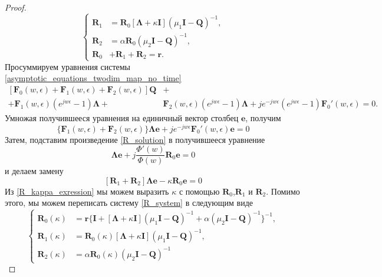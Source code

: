 \begin{proof}
\begin{equation} \label{R_system}
	\left\{
	\begin{aligned}
		\boldsymbol{R}_{1}& = \boldsymbol{R}_{0}[\boldsymbol{\Lambda} + \kappa\boldsymbol{I}](\mu_{1}\boldsymbol{I} - \boldsymbol{Q})^{-1},\\
		\boldsymbol{R}_{2}& = \alpha\boldsymbol{R}_{0}(\mu_2\boldsymbol{I} - \boldsymbol{Q})^{-1},\\
		\boldsymbol{R}_{0}& + \boldsymbol{R}_{1} + \boldsymbol{R}_{2} = \boldsymbol{r}.
	\end{aligned}
	\right.
\end{equation}
Просуммируем уравнения системы \eqref{asymptotic_equations_twodim_map_no_time}
\begin{equation*}
	\begin{split}
		[\boldsymbol{F}_{0}(w,\epsilon) + \boldsymbol{F}_{1}(w,\epsilon) +  \boldsymbol{F}_{2}(w,\epsilon)]\boldsymbol{Q} &+\\  + 
		\boldsymbol{F}_{1}(w,\epsilon)(e^{jw\epsilon} - 1)\boldsymbol{\Lambda} + & \boldsymbol{F}_{2}(w,\epsilon)(e^{jw\epsilon} - 1)\boldsymbol{\Lambda} + je^{-jw\epsilon}(e^{jw\epsilon} - 1)\boldsymbol{F}_{0}'(w,\epsilon) = 0.
	\end{split}
\end{equation*}
Умножая получившееся уравнения на единичный вектор столбец $\boldsymbol{e}$, получим
\begin{equation*}
	\{\boldsymbol{F}_{1}(w,\epsilon) + \boldsymbol{F}_{2}(w,\epsilon)\}\boldsymbol{\Lambda}\boldsymbol{e} + je^{-jw\epsilon}\boldsymbol{F}_{0}'(w,\epsilon)\boldsymbol{e} = 0
\end{equation*}
Затем, подставим произведение \eqref{R_solution} в получившееся уравнение
\begin{equation*}
	[\boldsymbol{R}_{1} + \boldsymbol{R}_{2}]\boldsymbol{\Lambda}\boldsymbol{e} + j\frac{\Phi'(w)}{\Phi(w)}\boldsymbol{R}_{0}\boldsymbol{e} = 0
\end{equation*}
 и делаем замену
 \begin{equation} \label{R_kappa_exression}
 	[\boldsymbol{R}_{1} + \boldsymbol{R}_{2}]\boldsymbol{\Lambda}\boldsymbol{e} -\kappa\boldsymbol{R}_{0}\boldsymbol{e} = 0
\end{equation}
Из \eqref{R_kappa_exression} мы можем выразить $\kappa$ с помощью $\boldsymbol{R}_{0}$,$\boldsymbol{R}_{1}$ и $\boldsymbol{R}_{2}$. Помимо этого, мы можем переписать систему \eqref{R_system} в следующим виде
\begin{equation*}
	\left\{
	\begin{aligned}
		\boldsymbol{R}_{0}(\kappa) & = \boldsymbol{r}\{\boldsymbol{I} + [\boldsymbol{\Lambda} + \kappa\boldsymbol{I}](\mu_{1}\boldsymbol{I}-\boldsymbol{Q})^{-1}+\alpha(\mu_{2}\boldsymbol{I}-\boldsymbol{Q})^{-1}\}^{-1},\\
		\boldsymbol{R}_{1}(\kappa) & = \boldsymbol{R}_{0}(\kappa)[\boldsymbol{\Lambda} + \kappa\boldsymbol{I}](\mu_{1}\boldsymbol{I} - \boldsymbol{Q})^{-1},\\
		\boldsymbol{R}_{2}(\kappa) & = \alpha\boldsymbol{R}_{0}(\kappa)(\mu_{2}\boldsymbol{I} - \boldsymbol{Q})^{-1}
	\end{aligned}
	\right.
\end{equation*}
\end{proof}
